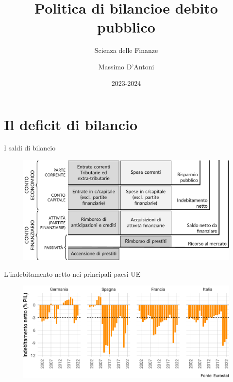 \documentclass[aspectratio=149,11pt,italian]{beamer}
\institute{Università di Siena}
\author{Massimo D'Antoni}
\date{2023-2024}
\title{Politica di bilancio\newline e debito pubblico}
\subtitle{Scienza delle Finanze}
\begin{document}
\maketitle

\section{Il deficit di bilancio}

\begin{frame}{I saldi di bilancio}
  \begin{figure}
    \centering
    \includegraphics[width=12cm]{./figure/saldi-di-bilancio.pdf}
  \end{figure}
\end{frame}

\begin{frame}{L'indebitamento netto nei principali paesi UE}
  \begin{figure}
    \centering
    \includegraphics[width=\textwidth]{./figure/deficit-4countries-2000-2022-color.pdf}
  \end{figure}
\end{frame}
\end{document}
